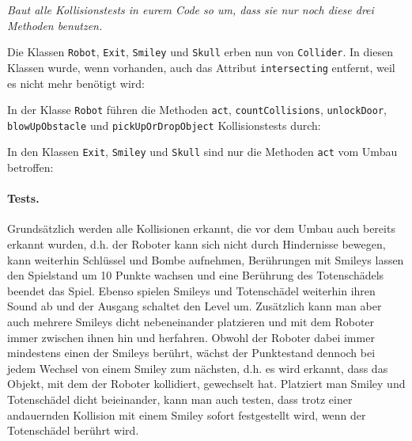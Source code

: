 \documentclass{../pi1-musterloesung}
\begin{document}
\emph{Baut alle Kollisionstests in eurem Code so um, dass sie nur noch diese drei Methoden benutzen.}

Die Klassen \texttt{Robot}, \texttt{Exit}, \texttt{Smiley} und \texttt{Skull} erben nun von \texttt{Collider}. In diesen Klassen wurde, wenn vorhanden, auch das Attribut \texttt{intersecting} entfernt, weil es nicht mehr benötigt wird:






In der Klasse \texttt{Robot} führen die Methoden \texttt{act}, \texttt{countCollisions}, \texttt{unlockDoor}, \texttt{blowUpObstacle} und \texttt{pickUpOrDropObject} Kollisionstests durch:







In den Klassen \texttt{Exit}, \texttt{Smiley} und \texttt{Skull} sind nur die Methoden \texttt{act} vom Umbau betroffen:





\paragraph{Tests.} Grundsätzlich werden alle Kollisionen erkannt, die vor dem Umbau auch bereits erkannt wurden, d.h. der Roboter kann sich nicht durch Hindernisse bewegen, kann weiterhin Schlüssel und Bombe aufnehmen, Berührungen mit Smileys lassen den Spielstand um 10 Punkte wachsen und eine Berührung des Totenschädels beendet das Spiel. Ebenso spielen Smileys und Totenschädel weiterhin ihren Sound ab und der Ausgang schaltet den Level um. Zusätzlich kann man aber auch mehrere Smileys dicht nebeneinander platzieren und mit dem Roboter immer zwischen ihnen hin und herfahren. Obwohl der Roboter dabei immer mindestens einen der Smileys berührt, wächst der Punktestand dennoch bei jedem Wechsel von einem Smiley zum nächsten, d.h. es wird erkannt, dass das Objekt, mit dem der Roboter kollidiert, gewechselt hat. Platziert man Smiley und Totenschädel dicht beieinander, kann man auch testen, dass trotz einer andauernden Kollision mit einem Smiley sofort festgestellt wird, wenn der Totenschädel berührt wird.
\end{document}

